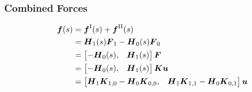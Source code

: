 \subsubsection*{Combined Forces}

\begin{align}
\boldsymbol{f}(s) &= \boldsymbol{f}^{\mathrm{I}}(s) + \boldsymbol{f}^{\mathrm{II}}(s) \notag \\
&= \boldsymbol{H}_{1}(s)\boldsymbol{F}_1 - \boldsymbol{H}_{0}(s)\boldsymbol{F}_0 \notag \\
&= \begin{bmatrix}
-\boldsymbol{H}_{0}(s), & \boldsymbol{H}_{1}(s)
\end{bmatrix}
\boldsymbol{F} \notag \\
&= \begin{bmatrix}
-\boldsymbol{H}_{0}(s), & \boldsymbol{H}_{1}(s)
\end{bmatrix}
\boldsymbol{K}\boldsymbol{u} \notag \\
&= \begin{bmatrix}
\boldsymbol{H}_{1}\boldsymbol{K}_{1,0} - \boldsymbol{H}_{0}\boldsymbol{K}_{0,0}, & \boldsymbol{H}_{1}\boldsymbol{K}_{1,1} - \boldsymbol{H}_{0}\boldsymbol{K}_{0,1}
\end{bmatrix}\boldsymbol{u} \notag \\
\end{align}

